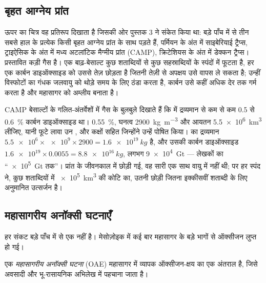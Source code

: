 \subsection*{बृहत आग्नेय प्रांत}

ऊपर का चित्र वह प्रतिरूप दिखाता है जिसकी ओर पुस्तक 3 ने संकेत किया था: बड़े पाँच में से
तीन सबसे हाल के प्रत्येक किसी बृहत आग्नेय प्रांत के साथ पड़ते हैं, पर्मियन के अंत में साइबेरियाई ट्रैप्स,
ट्राइऐसिक के अंत में मध्य अटलांटिक मैग्मीय प्रांत (CAMP), क्रिटेशियस के
अंत में डेक्कन ट्रैप्स। प्रस्तावित कड़ी गैस है। एक बाढ़-बेसाल्ट कुछ
शताब्दियों से कुछ सहस्राब्दियों के स्पंदों में फूटता है, हर एक कार्बन डाइऑक्साइड को उससे तेज़ छोड़ता है जितनी तेज़ी से अपक्षय उसे
वापस ले सकता है; उन्हीं विस्फोटों का गंधक जलवायु को थोड़े समय के लिए ठंडा करता है, कार्बन उसे कहीं अधिक
देर तक गर्म करता है और महासागर को अम्लीय बनाता है।

\begin{example}[मध्य अटलांटिक प्रांत का कार्बन]\label{ex:b2:phanerozoic-earth:camp}
CAMP बेसाल्टों के गलित-अंतर्वेशों में गैस के बुलबुले दिखाते हैं कि  में द्रव्यमान से कम से कम 0.5 से
\qty{0.6}{\percent} कार्बन डाइऑक्साइड था। \qty{0.55}{\percent}, घनत्व
\qty{2900}{kg.m^{-3}} और आयतन \qty{5.5e6}{km^3} लीजिए, यानी फूटे लावा उन , 
और कक्षों सहित जिन्होंने उन्हें पोषित किया।  का द्रव्यमान $\num{5.5e6} \times \num{e9} \times 2900 =
\qty{1.6e19}{kg}$ है, और उसकी कार्बन डाइऑक्साइड $\num{1.6e19} \times 0.0055 = \qty{8.8e16}{kg}$, लगभग
\qty{9e4}{Gt} --- लेखकों का ``\qty{e5}{Gt} तक''। प्रांत के जीवनकाल में छोड़ी गई, वह
सारी एक साथ वायु में नहीं थी; पर हर स्पंद ने, कुछ शताब्दियों में \qty{e5}{km^3} की कोटि का,
उतनी छोड़ी जितना इक्कीसवीं शताब्दी के लिए अनुमानित उत्सर्जन है।
\end{example}

\subsection*{महासागरीय अनॉक्सी घटनाएँ}

हर संकट बड़े पाँच में से एक नहीं है। मेसोज़ोइक में कई बार महासागर के बड़े भागों से
ऑक्सीजन लुप्त हो गई।

\begin{definition}[महासागरीय अनॉक्सी घटना]\label{def:b2:phanerozoic-earth:oae}
एक \emph{महासागरीय अनॉक्सी घटना} (OAE) महासागर में व्यापक
ऑक्सीजन-क्षय का एक अंतराल है, जिसे अवसादी और भू-रासायनिक अभिलेख में पहचाना जाता है।
\end{definition}

